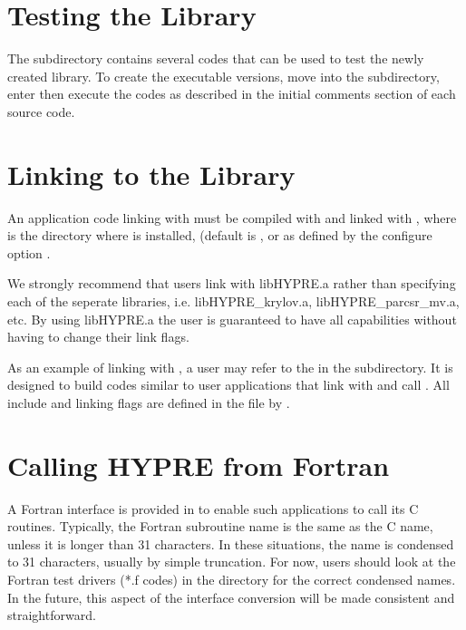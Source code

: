 
\section{Testing the Library} 

The  subdirectory contains several codes that can be used to test
the newly created \hypre{} library.  To create the executable versions, move into
the  subdirectory, enter  then execute the codes as described
in the initial comments section of each source code.


\section{Linking to the Library}

An application code linking with \hypre{} must be compiled with  
and linked with , where  is the directory 
where \hypre{} is installed, (default is , or as defined by the configure 
option . 

We strongly recommend that users link with libHYPRE.a rather than specifying each 
of the seperate \hypre{} libraries, i.e.  libHYPRE\_krylov.a, libHYPRE\_parcsr\_mv.a,
etc.  By using libHYPRE.a the user is guaranteed to have all capabilities without
having to change their link flags.

As an example of linking with \hypre{}, a user may refer to the  in the 
 subdirectory.  It is designed to build codes similar to user applications
that link with and call \hypre{}.  All include and linking flags are defined in the 
 file by .


\section{Calling HYPRE from Fortran}

A Fortran interface is provided in \hypre{} to enable such applications to call its C
routines.  Typically, the Fortran subroutine name is the same as the C name, unless 
it is longer than 31 characters.  In these situations, the name is condensed to 31
characters, usually by simple truncation.  For now, users should look at the Fortran 
test drivers (*.f codes) in the  directory for the correct condensed 
names.  In the future, this aspect of the interface conversion will be made 
consistent and straightforward.

